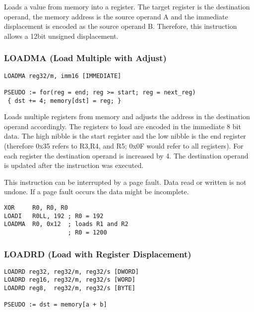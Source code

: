 Loads a value from memory into a register. The target register is the destination operand, the memory address is the source operand A and
the immediate displacement is encoded as the source operand B. Therefore, this instruction allows a 12bit unsigned displacement. 

\subsubsection{LOADMA (Load Multiple with Adjust)}

\begin{verbatim}
LOADMA reg32/m, imm16 [IMMEDIATE]

PSEUDO := for(reg = end; reg >= start; reg = next_reg) 
 { dst += 4; memory[dst] = reg; }
\end{verbatim}


Loads multiple registers from memory and adjusts the address in the destination operand accordingly. The registers
to load are encoded in the immediate 8 bit data. The high nibble is the start register and the low nibble is the end register (therefore
0x35 refers to R3,R4, and R5; 0x0F would refer to all registers). For each register the destination operand is increased by 4. The destination
operand is updated after the instruction was executed. 


This instruction can be interrupted by a page fault. Data read or written is not undone. If a page fault occurs the data might be incomplete. 


\begin{verbatim}
XOR     R0, R0, R0
LOADI   R0LL, 192 ; R0 = 192
LOADMA  R0, 0x12  ; loads R1 and R2
                  ; R0 = 1200
\end{verbatim}

\subsubsection{LOADRD (Load with Register Displacement)}

\begin{verbatim}
LOADRD reg32, reg32/m, reg32/s [DWORD]
LOADRD reg16, reg32/m, reg32/s [WORD]
LOADRD reg8,  reg32/m, reg32/s [BYTE] 

PSEUDO := dst = memory[a + b]
\end{verbatim}


